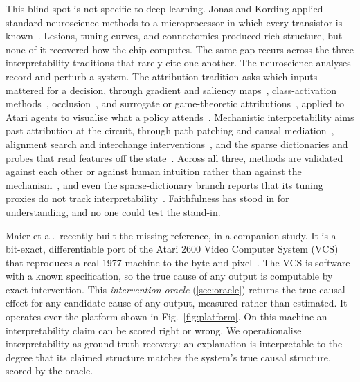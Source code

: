 This blind spot is not specific to deep learning. Jonas and Kording applied standard
neuroscience methods to a microprocessor in which every transistor is
known~\cite{jonas2017could}. Lesions, tuning curves, and connectomics produced rich
structure, but none of it recovered how the chip computes. The same gap recurs across the
three interpretability traditions that rarely cite one another. The neuroscience analyses
record and perturb a system. The attribution tradition asks which inputs mattered for a
decision, through gradient and saliency
maps~\cite{simonyan2014deep,sundararajan2017axiomatic,smilkov2017smoothgrad,springenberg2015striving},
class-activation methods~\cite{selvaraju2017gradcam,chattopadhyay2018gradcampp},
occlusion~\cite{zeiler2014visualizing,fong2017interpretable,petsiuk2018rise}, and surrogate
or game-theoretic attributions~\cite{ribeiro2016why,lundberg2017unified}, applied to Atari
agents to visualise what a policy attends~\cite{greydanus2018visualizing,such2019atarizoo}.
Mechanistic interpretability aims past attribution at the circuit, through path patching and
causal mediation~\cite{vig2020investigating,meng2022locating,wang2022interpretability,conmy2023towards},
alignment search and interchange interventions~\cite{geiger2021causal,geiger2023finding}, and
the sparse dictionaries and probes that read features off the
state~\cite{cunningham2023sparse,alain2017understanding,hewitt2019designing,belrose2023eliciting,nanda2023attribution}.
Across all three, methods are validated against each other or against human intuition rather
than against the mechanism~\cite{atrey2020exploratory}, and even the sparse-dictionary branch
reports that its tuning proxies do not track interpretability~\cite{saebench2025}.
Faithfulness has stood in for understanding, and no one could test the stand-in.

Maier et al.\ recently built the missing reference, in a companion study. It is a bit-exact, differentiable port
of the Atari 2600 Video Computer System (VCS) that reproduces a real 1977 machine to the
byte and pixel~\cite{maier2025vcs,xitari}. The VCS is software with a known specification,
so the true cause of any output is computable by exact intervention. This \emph{intervention
oracle} (\Sectionname\ref{sec:oracle}) returns the true causal effect for any candidate
cause of any output, measured rather than estimated. It operates over the platform shown in
Fig.~\ref{fig:platform}. On this machine an interpretability claim can be scored right or
wrong. We operationalise interpretability as ground-truth recovery: an explanation is
interpretable to the degree that its claimed structure matches the system's true causal
structure, scored by the oracle.

